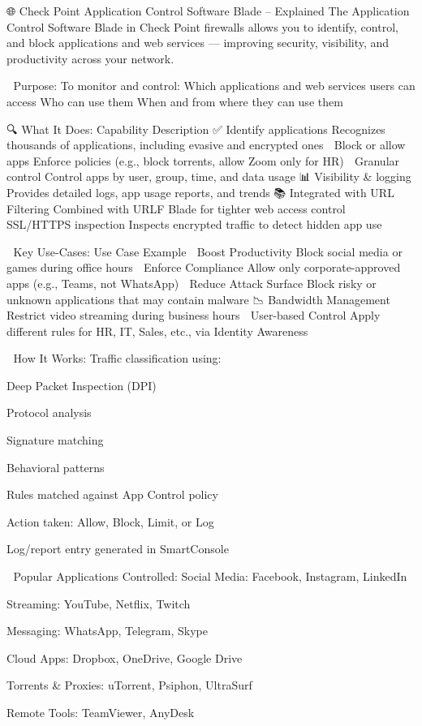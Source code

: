 🌐 Check Point Application Control Software Blade – Explained
The Application Control Software Blade in Check Point firewalls allows you to identify, control, and 
block applications and web services — improving security, visibility, and productivity across your network.

🎯 Purpose:
To monitor and control:
Which applications and web services users can access
Who can use them
When and from where they can use them

🔍 What It Does:
Capability	Description
✅ Identify applications	Recognizes thousands of applications, including evasive and encrypted ones
🚫 Block or allow apps	Enforce policies (e.g., block torrents, allow Zoom only for HR)
🧠 Granular control	Control apps by user, group, time, and data usage
📊 Visibility & logging	Provides detailed logs, app usage reports, and trends
📚 Integrated with URL Filtering	Combined with URLF Blade for tighter web access control
🔐 SSL/HTTPS inspection	Inspects encrypted traffic to detect hidden app use

🧠 Key Use-Cases:
Use Case	Example
💼 Boost Productivity	Block social media or games during office hours
🎯 Enforce Compliance	Allow only corporate-approved apps (e.g., Teams, not WhatsApp)
🧱 Reduce Attack Surface	Block risky or unknown applications that may contain malware
📉 Bandwidth Management	Restrict video streaming during business hours
👤 User-based Control	Apply different rules for HR, IT, Sales, etc., via Identity Awareness

🧩 How It Works:
Traffic classification using:

Deep Packet Inspection (DPI)

Protocol analysis

Signature matching

Behavioral patterns

Rules matched against App Control policy

Action taken: Allow, Block, Limit, or Log

Log/report entry generated in SmartConsole

🔗 Popular Applications Controlled:
Social Media: Facebook, Instagram, LinkedIn

Streaming: YouTube, Netflix, Twitch

Messaging: WhatsApp, Telegram, Skype

Cloud Apps: Dropbox, OneDrive, Google Drive

Torrents & Proxies: uTorrent, Psiphon, UltraSurf

Remote Tools: TeamViewer, AnyDesk

